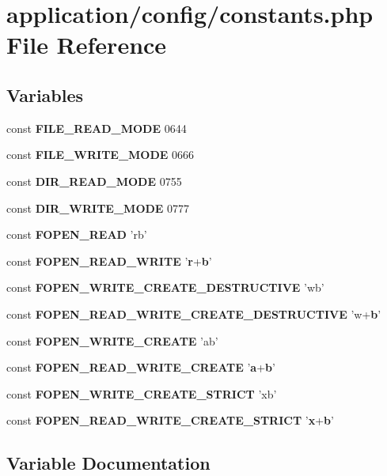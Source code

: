 \section{application/config/constants.php File Reference}
\label{constants_8php}
\subsection*{Variables}
\begin{DoxyCompactItemize}
\item 
const {\bf F\-I\-L\-E\-\_\-\-R\-E\-A\-D\-\_\-\-M\-O\-D\-E} 0644
\item 
const {\bf F\-I\-L\-E\-\_\-\-W\-R\-I\-T\-E\-\_\-\-M\-O\-D\-E} 0666
\item 
const {\bf D\-I\-R\-\_\-\-R\-E\-A\-D\-\_\-\-M\-O\-D\-E} 0755
\item 
const {\bf D\-I\-R\-\_\-\-W\-R\-I\-T\-E\-\_\-\-M\-O\-D\-E} 0777
\item 
const {\bf F\-O\-P\-E\-N\-\_\-\-R\-E\-A\-D} 'rb'
\item 
const {\bf F\-O\-P\-E\-N\-\_\-\-R\-E\-A\-D\-\_\-\-W\-R\-I\-T\-E} '{\bf r}+{\bf b}'
\item 
const {\bf F\-O\-P\-E\-N\-\_\-\-W\-R\-I\-T\-E\-\_\-\-C\-R\-E\-A\-T\-E\-\_\-\-D\-E\-S\-T\-R\-U\-C\-T\-I\-V\-E} 'wb'
\item 
const {\bf F\-O\-P\-E\-N\-\_\-\-R\-E\-A\-D\-\_\-\-W\-R\-I\-T\-E\-\_\-\-C\-R\-E\-A\-T\-E\-\_\-\-D\-E\-S\-T\-R\-U\-C\-T\-I\-V\-E} 'w+{\bf b}'
\item 
const {\bf F\-O\-P\-E\-N\-\_\-\-W\-R\-I\-T\-E\-\_\-\-C\-R\-E\-A\-T\-E} 'ab'
\item 
const {\bf F\-O\-P\-E\-N\-\_\-\-R\-E\-A\-D\-\_\-\-W\-R\-I\-T\-E\-\_\-\-C\-R\-E\-A\-T\-E} '{\bf a}+{\bf b}'
\item 
const {\bf F\-O\-P\-E\-N\-\_\-\-W\-R\-I\-T\-E\-\_\-\-C\-R\-E\-A\-T\-E\-\_\-\-S\-T\-R\-I\-C\-T} 'xb'
\item 
const {\bf F\-O\-P\-E\-N\-\_\-\-R\-E\-A\-D\-\_\-\-W\-R\-I\-T\-E\-\_\-\-C\-R\-E\-A\-T\-E\-\_\-\-S\-T\-R\-I\-C\-T} '{\bf x}+{\bf b}'
\end{DoxyCompactItemize}


\subsection{Variable Documentation}
